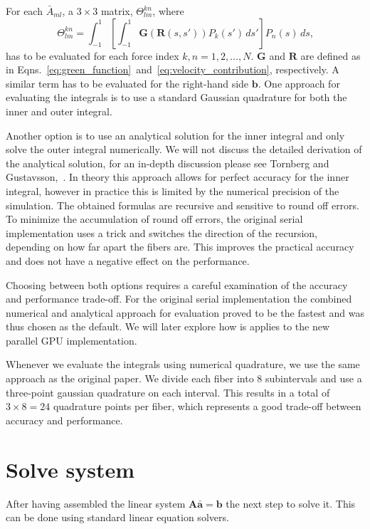 For each $\bar{A}_{ml}$, a $3\times3$ matrix, $\Theta_{lm}^{kn}$, where
\begin{equation}
  \label{eq:inner_integral}
  \Theta_{lm}^{kn} = \int_{-1}^{1} \left[\int_{-1}^{1}\mathbf{G}(\mathbf{R}(s,s')) P_k(s') \, ds' \right]P_n(s) \, ds \text{,}
\end{equation}
has to be evaluated for each force index $k,n = 1,2,\dots,N$. $\mathbf{G}$ and $\mathbf{R}$ are defined as in Eqns.~\eqref{eq:green_function}~and~\eqref{eq:velocity_contribution}, respectively. A similar term has to be evaluated for the right-hand side $\mathbf{b}$. One approach for evaluating the integrals is to use a standard Gaussian quadrature for both the inner and outer integral. 

Another option is to use an analytical solution for the inner integral and only solve the outer integral numerically. We will not discuss the detailed derivation of the analytical solution, for an in-depth discussion please see Tornberg and Gustavsson,~\cite{Tornberg2006}. In theory this approach allows for perfect accuracy for the inner integral, however in practice this is limited by the numerical precision of the simulation. The obtained formulas are recursive and sensitive to round off errors. To minimize the accumulation of round off errors, the original serial implementation uses a trick and switches the direction of the recursion, depending on how far apart the fibers are. This improves the practical accuracy and does not have a negative effect on the performance.

Choosing between both options requires a careful examination of the accuracy and performance trade-off. For the original serial implementation the combined numerical and analytical approach for evaluation proved to be the fastest and was thus chosen as the default. We will later explore how is applies to the new parallel GPU implementation.

Whenever we evaluate the integrals using numerical quadrature, we use the same approach as the original paper. We divide each fiber into 8 subintervals and use a three-point gaussian quadrature on each interval. This results in a total of $3 \times 8 = 24$ quadrature points per fiber, which represents a good trade-off between accuracy and performance.

\section{Solve system}

After having assembled the linear system $\mathbf{A}\mathbf{\bar{a}}=\mathbf{b}$ the next step to solve it. This can be done using standard linear equation solvers.

